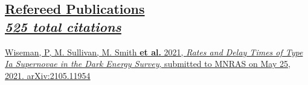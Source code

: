 \documentclass[margin]{res}
\begin{document}
\begin{resume}
\section{
\href{https://ui.adsabs.harvard.edu/search/filter_property_fq_property=AND&filter_property_fq_property=property\%3A\%22refereed\%22&fq=\%7B!type\%3Daqp\%20v\%3D\%24fq_property\%7D&fq_property=(property\%3A\%22refereed\%22)&p_=0&q=orcid\%3A0000-0002-1873-8973&sort=citation_count\%20desc\%2C\%20bibcode\%20desc}
{Refereed Publications\\  
\normalfont \textit{\small{\hspace{-0.3em}
525 total citations
}}}
}


\hangindent=15pt 
\href{https://arxiv.org/abs/2105.11954}{Wiseman, P, M. Sullivan, M. Smith {\bf et al.} 2021, {\sl Rates and Delay Times of Type Ia Supernovae in the Dark Energy Survey}, submitted to MNRAS on May 25, 2021. arXiv:2105.11954} 
\vspace{-12pt}


\end{resume}
\end{document}
